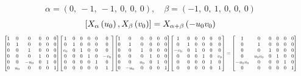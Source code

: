 \documentclass[11pt]{article}
\theoremstyle{definition}
\begin{document}
\[
\alpha = \left( 0, \  -1, \  -1, \  0, \  0, \  0\right), \quad \beta = \left( -1, \  0, \  1, \  0, \  0, \  0\right)
\]
\[
\scaletoalign{\textwidth}{\left[ X_{\alpha}\left(u_{0}\right), X_{\beta}\left(v_{0}\right) \right] = X_{\alpha + \beta}\left(- u_{0} v_{0}\right)}
\]
\[
\scaletoalign{\textwidth}{{\left[\begin{matrix}1 & 0 & 0 & 0 & 0 & 0\\0 & 1 & 0 & 0 & 0 & 0\\0 & 0 & 1 & 0 & 0 & 0\\0 & 0 & 0 & 1 & 0 & 0\\0 & 0 & - u_{0} & 0 & 1 & 0\\0 & u_{0} & 0 & 0 & 0 & 1\end{matrix}\right]} {\left[\begin{matrix}1 & 0 & 0 & 0 & 0 & 0\\0 & 1 & 0 & 0 & 0 & 0\\v_{0} & 0 & 1 & 0 & 0 & 0\\0 & 0 & 0 & 1 & 0 & - v_{0}\\0 & 0 & 0 & 0 & 1 & 0\\0 & 0 & 0 & 0 & 0 & 1\end{matrix}\right]} {\left[\begin{matrix}1 & 0 & 0 & 0 & 0 & 0\\0 & 1 & 0 & 0 & 0 & 0\\0 & 0 & 1 & 0 & 0 & 0\\0 & 0 & 0 & 1 & 0 & 0\\0 & 0 & u_{0} & 0 & 1 & 0\\0 & - u_{0} & 0 & 0 & 0 & 1\end{matrix}\right]} {\left[\begin{matrix}1 & 0 & 0 & 0 & 0 & 0\\0 & 1 & 0 & 0 & 0 & 0\\- v_{0} & 0 & 1 & 0 & 0 & 0\\0 & 0 & 0 & 1 & 0 & v_{0}\\0 & 0 & 0 & 0 & 1 & 0\\0 & 0 & 0 & 0 & 0 & 1\end{matrix}\right]} = {\left[\begin{matrix}1 & 0 & 0 & 0 & 0 & 0\\0 & 1 & 0 & 0 & 0 & 0\\0 & 0 & 1 & 0 & 0 & 0\\0 & u_{0} v_{0} & 0 & 1 & 0 & 0\\- u_{0} v_{0} & 0 & 0 & 0 & 1 & 0\\0 & 0 & 0 & 0 & 0 & 1\end{matrix}\right]}}
\]
\end{document}
